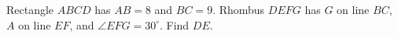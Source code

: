 Rectangle $ABCD$ has $AB=8$ and $BC=9$. Rhombus $DEFG$ has $G$ on line $BC$, $A$ on line $EF$, and $\angle EFG=30^\circ$. Find $DE$.
